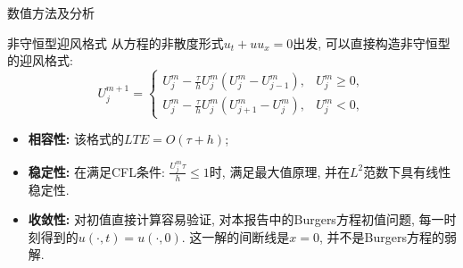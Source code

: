 \documentclass{article}
\begin{document}
\begin{section}{数值方法及分析}
    \begin{subsection}{非守恒型迎风格式}
        从方程的非散度形式$u_t+uu_x=0$出发, 可以直接构造非守恒型的迎风格式:
        $$U_j^{m+1} = \left\{\begin{array}{ll}
            U_j^m - \frac{\tau}{h}U_j^m(U_j^m-U_{j-1}^m), & U_j^m \geq 0,\\
            U_j^m - \frac{\tau}{h}U_j^m(U_{j+1}^m-U_j^m), & U_j^m <0,
        \end{array}\right.$$
        \begin{itemize}
            \item \textbf{相容性: }该格式的$LTE = O(\tau+h)$;
            \item \textbf{稳定性: }在满足CFL条件: $\frac{U_j^m\tau}{h}\leq 1$时, 满足最大值原理, 并在$L^2$范数下具有线性稳定性.
            \item \textbf{收敛性: }对初值直接计算容易验证, 对本报告中的Burgers方程初值问题, 每一时刻得到的$u(\cdot,t)=u(\cdot,0)$. 这一解的间断线是$x=0$, 并不是Burgers方程的弱解.
        \end{itemize}


\end{subsection}
\end{section}
\end{document}
